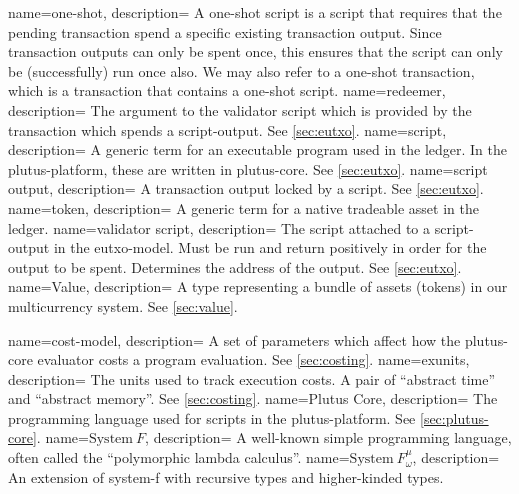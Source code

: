 {
  name=one-shot,
  description={
    A one-shot script is a script that requires that the pending transaction spend a specific existing transaction output.
    Since transaction outputs can only be spent once, this ensures that the script can only be (successfully) run once also.
    We may also refer to a one-shot transaction, which is a transaction that contains a one-shot script.
  }
}
{
  name=redeemer,
  description={
    The argument to the validator \gls{script} which is provided by the transaction which spends a \gls{script-output}.
    See \cref{sec:eutxo}.
  }
}
{
  name=script,
  description={
    A generic term for an executable program used in the ledger.
    In the \gls{plutus-platform}, these are written in \gls{plutus-core}.
    See \cref{sec:eutxo}.
  }
}
{
  name=script output,
  description={
    A transaction output locked by a \gls{script}.
    See \cref{sec:eutxo}.
  }
}
{
  name=token,
  description={
    A generic term for a native tradeable asset in the ledger.
  }
}
{
  name=validator script,
  description={
    The \gls{script} attached to a \gls{script-output} in the \gls{eutxo-model}.
    Must be run and return positively in order for the output to be spent.
    Determines the \gls{address} of the output.
    See \cref{sec:eutxo}.
  }
}
{
  name=\textsf{Value},
  description={
    A type representing a bundle of assets (\glspl{token}) in our \gls{multicurrency} system.
    See \cref{sec:value}.
  }
}

{
  name=cost-model,
  description={
    A set of parameters which affect how the \gls{plutus-core} evaluator costs a program evaluation.
    See \cref{sec:costing}.
  }
}
{
  name=exunits,
  description={
    The units used to track execution costs.
    A pair of ``abstract time'' and ``abstract memory''.
    See \cref{sec:costing}.
  }
}
{
  name=Plutus Core,
  description={
    The programming language used for \glspl{script} in the \gls{plutus-platform}.
    See \cref{sec:plutus-core}.
  }
}
{
  name={\ensuremath{\textrm{System}\ F}},
  description={
    A well-known simple programming language, often called the ``polymorphic lambda calculus''.
  }
}
{
  name={\ensuremath{\textrm{System}\ F_{\omega}^\mu}},
  description={
    An extension of \gls{system-f} with recursive types and higher-kinded types.
  }
}

